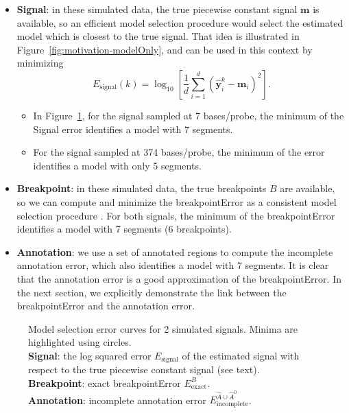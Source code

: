 \documentclass{jsfds} %
\begin{document}
\begin{itemize}
\item \textbf{Signal}: in these simulated data, the true piecewise
  constant signal $\mathbf m$ is available, so an efficient model
  selection procedure \citep{sylvain-survey} would select the
  estimated model which is closest to the true signal. That idea is
  illustrated in Figure~\ref{fig:motivation-modelOnly}, and can be
  used in this context by minimizing
  \begin{equation}
    \label{eq:signal_cost}
    E_{\text{signal}}(k) = \log_{10}\left[
\frac 1 d \sum_{i=1}^d(\mathbf{\hat y}_i^k - \mathbf m_i)^2
\right].
  \end{equation}
  \begin{itemize}
  \item In Figure~\ref{fig:variable-density-sigerr-small}, for the
    signal sampled at 7 bases/probe, the minimum of the Signal error
    identifies a model with 7 segments.
  \item For the signal sampled at 374 bases/probe, the minimum of the
    error identifies a model with only 5 segments.
  \end{itemize}
\item \textbf{Breakpoint}: in these simulated data, the true
  breakpoints $B$ are available, so we can compute and minimize the
  breakpointError as a consistent model selection procedure
  \citep{sylvain-survey}. For both signals, the minimum of the
  breakpointError identifies a model with 7 segments (6
  breakpoints).
\item \textbf{Annotation}: we use a set of annotated regions to
  compute the incomplete annotation error, which also identifies a
  model with 7 segments. It is clear that the annotation error is a
  good approximation of the breakpointError. In the next section, we
  explicitly demonstrate the link between the breakpointError and the
  annotation error.
\end{itemize}
\begin{figure}[H]
  \centering
  
  \vskip -0.5cm
  \caption{Model selection error curves for 2 simulated
    signals. Minima are highlighted using circles.
    \protect\\
    \textbf{Signal}: the log squared error $E_{\text{signal}}$ of the
    estimated signal with respect to the
    true piecewise constant signal (see text).
    \protect\\
    \textbf{Breakpoint}: exact breakpointError $E^B_{\text{exact}}$.
    \protect\\
    \textbf{Annotation}: incomplete annotation error
    $E^{\hat A\cup \hat A^0}_{\text{incomplete}}$.
}
  \label{fig:variable-density-sigerr-small}
\end{figure}
\end{document}
